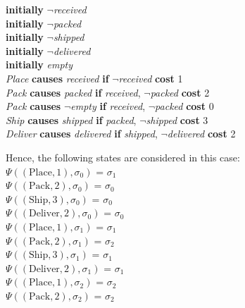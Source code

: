 \documentclass[a4paper]{article}
\begin{document}
\begin{center}
\textbf{initially} $\neg$\textit{received} \\[0.1\baselineskip]
\textbf{initially} $\neg$\textit{packed} \\[0.1\baselineskip]
\textbf{initially} $\neg$\textit{shipped} \\[0.1\baselineskip]
\textbf{initially} $\neg$\textit{delivered} \\[0.1\baselineskip]
\textbf{initially} \textit{empty} \\[0.5\baselineskip]
\textit{Place} \textbf{causes} \textit{received} \textbf{if} $\neg$\textit{received} \textbf{cost} 1 \\[0.1\baselineskip]
\textit{Pack} \textbf{causes} \textit{packed} \textbf{if} \textit{received}, $\neg$\textit{packed} \textbf{cost} 2 \\[0.1\baselineskip]
\textit{Pack} \textbf{causes} $\neg$\textit{empty} \textbf{if} \textit{received}, $\neg$\textit{packed} \textbf{cost} 0 \\[0.1\baselineskip]
\textit{Ship} \textbf{causes} \textit{shipped} \textbf{if} \textit{packed}, $\neg$\textit{shipped} \textbf{cost} 3 \\[0.1\baselineskip]
\textit{Deliver} \textbf{causes} \textit{delivered} \textbf{if} \textit{shipped}, $\neg$\textit{delivered} \textbf{cost} 2 \\[0.5\baselineskip]
\end{center}
Hence, the following states are considered in this case: \\[0.5\baselineskip] 
$\Psi((\text{Place},1),\sigma_0)$ = $\sigma_1$ \\[0.1\baselineskip] 
$\Psi((\text{Pack},2),\sigma_0)$ = $\sigma_0$ \\[0.1\baselineskip] 
$\Psi((\text{Ship},3),\sigma_0)$ = $\sigma_0$ \\[0.1\baselineskip] 
$\Psi((\text{Deliver},2),\sigma_0)$ = $\sigma_0$ \\[0.7\baselineskip]
$\Psi((\text{Place},1),\sigma_1)$ = $\sigma_1$ \\[0.1\baselineskip] 
$\Psi((\text{Pack},2),\sigma_1)$ = $\sigma_2$ \\[0.1\baselineskip] 
$\Psi((\text{Ship},3),\sigma_1)$ = $\sigma_1$ \\[0.1\baselineskip] 
$\Psi((\text{Deliver},2),\sigma_1)$ = $\sigma_1$ \\[0.7\baselineskip] 
$\Psi((\text{Place},1),\sigma_2)$ = $\sigma_2$ \\[0.1\baselineskip] 
$\Psi((\text{Pack},2),\sigma_2)$ = $\sigma_2$ \\[0.1\baselineskip] 
\end{document}
